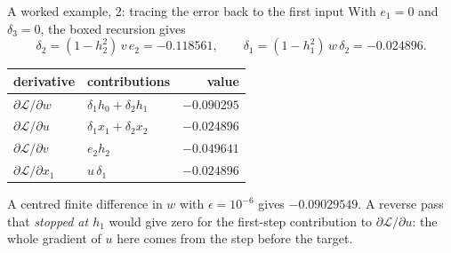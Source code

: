 \documentclass[10pt,aspectratio=169]{beamer}
\begin{document}
\begin{frame}{A worked example, 2: tracing the error back to the first input}
With $e_1=0$ and $\delta_3=0$, the boxed recursion gives
\[
  \delta_2=(1-h_2^2)\,v\,e_2=-0.118561,\qquad
  \delta_1=(1-h_1^2)\,w\,\delta_2=-0.024896 .
\]
\begin{center}
\begin{tabular}{llr}\toprule
derivative & contributions & value\\\midrule
$\partial\mathcal{L}/\partial w$ & $\delta_1h_0+\delta_2h_1$ & $-0.090295$\\
$\partial\mathcal{L}/\partial u$ & $\delta_1x_1+\delta_2x_2$ & $-0.024896$\\
$\partial\mathcal{L}/\partial v$ & $e_2h_2$ & $-0.049641$\\
$\partial\mathcal{L}/\partial x_1$ & $u\,\delta_1$ & $-0.024896$\\\bottomrule
\end{tabular}
\end{center}
A centred finite difference in $w$ with $\epsilon=10^{-6}$ gives
$-0.09029549$.  A reverse pass that \emph{stopped at $h_1$} would give zero
for the first-step contribution to $\partial\mathcal{L}/\partial u$: the
whole gradient of $u$ here comes from the step before the target.
\end{frame}
\end{document}
